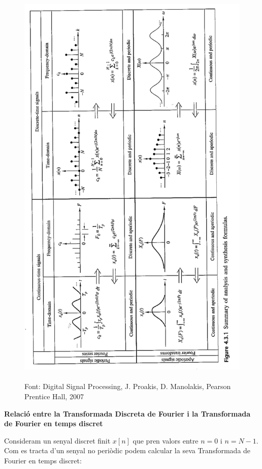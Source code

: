 \documentclass{article}
\begin{document}
\begin{figure}[htbp]
\begin{center}
\includegraphics[height=20cm]{sumariTF.png}
\end{center}
\caption{Font: Digital Signal Processing, J. Proakis, D. Manolakis, Pearson Prentice Hall, 2007}
\label{sumariFourier}
\end{figure}




\noindent
\textbf{Relaci\'o entre la Transformada Discreta de Fourier i la Transformada de Fourier en temps discret}

Consideram un senyal discret finit $x[n]$ que pren valors entre $n=0$ i $n=N-1$.
Com es tracta d'un senyal no peri\`odic podem calcular la seva Transformada de Fourier en temps discret:
\end{document}
